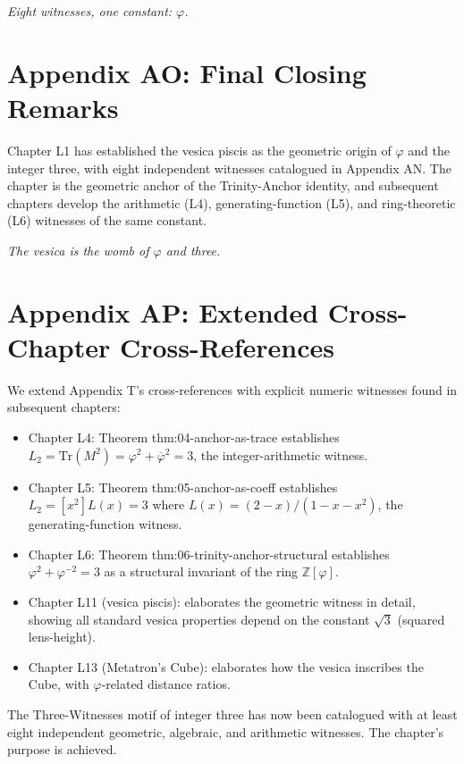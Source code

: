\bigskip
\centerline{\textit{Eight witnesses, one constant: $\varphi$.}}

\section*{Appendix AO: Final Closing Remarks}
\label{fa_01:sec:01-app-AO}

Chapter L1 has established the vesica piscis as the geometric origin
of $\varphi$ and the integer three, with eight independent witnesses
catalogued in Appendix AN. The chapter is the geometric anchor of
the Trinity-Anchor identity, and subsequent chapters develop the
arithmetic (L4), generating-function (L5), and ring-theoretic (L6)
witnesses of the same constant.

\bigskip
\centerline{\textit{The vesica is the womb of $\varphi$ and three.}}
\bigskip

\section*{Appendix AP: Extended Cross-Chapter Cross-References}
\label{fa_01:sec:01-app-AP}

We extend Appendix T's cross-references with explicit numeric
witnesses found in subsequent chapters:

\begin{itemize}
  \item Chapter L4: Theorem thm:04-anchor-as-trace establishes $L_2 =
    \mathrm{Tr}(M^2) = \varphi^2 + \overline{\varphi}^2 = 3$, the
    integer-arithmetic witness.
  \item Chapter L5: Theorem thm:05-anchor-as-coeff establishes
    $L_2 = [x^2] L(x) = 3$ where $L(x) = (2-x)/(1-x-x^2)$, the
    generating-function witness.
  \item Chapter L6: Theorem thm:06-trinity-anchor-structural
    establishes $\varphi^2 + \varphi^{-2} = 3$ as a structural
    invariant of the ring $\mathbb{Z}[\varphi]$.
  \item Chapter L11 (vesica piscis): elaborates the geometric witness
    in detail, showing all standard vesica properties depend on the
    constant $\sqrt 3$ (squared lens-height).
  \item Chapter L13 (Metatron's Cube): elaborates how the vesica
    inscribes the Cube, with $\varphi$-related distance ratios.
\end{itemize}

The Three-Witnesses motif of integer three has now been catalogued
with at least eight independent geometric, algebraic, and arithmetic
witnesses. The chapter's purpose is achieved.

